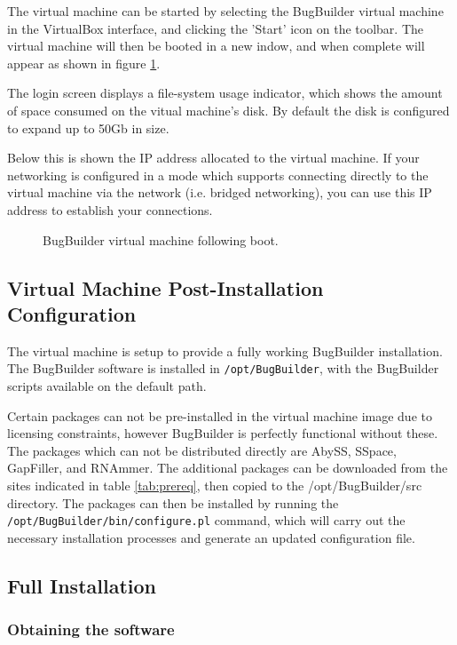 \documentclass[a4paper,10pt]{article}
\begin{document}
The virtual machine can be started by selecting the BugBuilder virtual machine
in the VirtualBox interface, and clicking the 'Start' icon on the toolbar.  The
virtual machine will then be booted in a new indow, and when complete will
appear as shown in figure \ref{fig:vm_running}.

The login screen displays a file-system usage indicator, which shows the amount
of space consumed on the vitual machine's disk. By default the disk is
configured to expand up to 50Gb in size.

Below this is shown the IP address allocated to the virtual machine. If your
networking is configured in a mode which supports connecting directly to the
virtual machine via the network (i.e. bridged networking), you can use this IP
address to establish your connections.

\begin{figure}[H] 
\caption{BugBuilder virtual machine following boot.} \label{fig:vm_running}
\end{figure}

\subsection{Virtual Machine Post-Installation Configuration}

The virtual machine is setup to provide a fully working BugBuilder
installation. The BugBuilder software is installed in {\tt /opt/BugBuilder},
with the BugBuilder scripts available on the default path. 

Certain packages can not be pre-installed in the virtual machine image due to
licensing constraints, however BugBuilder is perfectly functional without
these. The packages which can not be distributed directly are AbySS, SSpace,
GapFiller, and RNAmmer. The additional packages can be downloaded from
the sites indicated in table \ref{tab:prereq}, then copied to the
/opt/BugBuilder/src directory.  The packages can then be installed by running
the {\tt /opt/BugBuilder/bin/configure.pl} command, which will carry out the
necessary installation processes and generate an updated configuration file.

\subsection{Full Installation}

\subsubsection{Obtaining the software}
\end{document}
